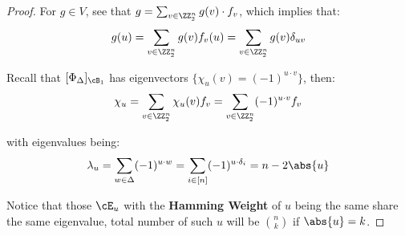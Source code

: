 \begin{proof}
	For \( g\in V \), see that \( g = \sum_{v\in \ZZ^n_2}g(v)\cdot f_v \), which implies that:
	\[
		g(u) = \sum_{v\in \ZZ^n_2} g(v)f_v(u) = \sum_{v\in \ZZ^n_2} g(v) \delta_{uv}
	\]

	Recall that \( [\Phi_\Delta]_{\cB_1} \) has eigenvectors \( \{\chi_u(v) = (-1)^{u\cdot v}\} \), then:
	\[
		\chi_u = \sum_{v\in \ZZ^n_2}\chi_u(v) f_v = \sum_{v\in \ZZ^n_2} (-1)^{u\cdot v} f_v
	\]

	with eigenvalues being:
	\[
		\lambda_u = \sum_{w\in \Delta} (-1)^{u\cdot w} = \sum_{i\in [n]} (-1)^{u\cdot \delta_i} = n - 2\abs{u}
	\]

	Notice that those \( \cE_u \) with the \textbf{Hamming Weight} of \( u \) being the same share the same eigenvalue, total number of such \( u \) will be \( \binom{n}{k} \) if \( \abs{u} = k \).
\end{proof}

